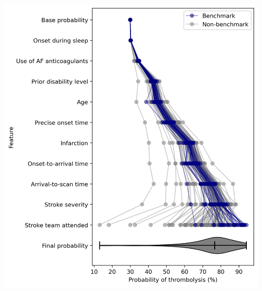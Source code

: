 \documentclass{beamer}
\begin{document}
\begin{frame}
\begin{columns}
    \begin{column}{0.55\textwidth}
        \begin{center}
        \includegraphics[width=1.0\textwidth]{./images/shap_waterfall_with_violin.jpg}
        \end{center}
    \end{column}
    
\end{columns}

\end{frame}


\end{document}
